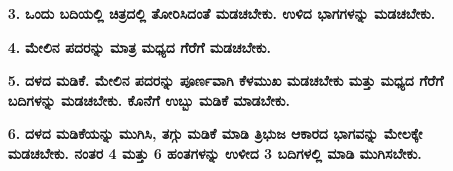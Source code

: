 \begin{enumerate}
\begin{itemize}
\item[{\bf 3.}] \textbf{ಒಂದು ಬದಿಯಲ್ಲಿ ಚಿತ್ರದಲ್ಲಿ ತೋರಿಸಿದಂತೆ ಮಡಚಬೇಕು. ಉಳಿದ ಭಾಗ\-ಗಳನ್ನು ಮಡಚಬೇಕು.}
\begin{figure}[H]
\end{figure}

\item[{\bf 4.}] \textbf{ಮೇಲಿನ ಪದರನ್ನು ಮಾತ್ರ ಮಧ್ಯದ ಗೆರೆಗೆ ಮಡಚಬೇಕು.}

\item[{\bf 5.}] \textbf{ದಳದ ಮಡಿಕೆ. ಮೇಲಿನ ಪದರನ್ನು ಪೂರ್ಣವಾಗಿ ಕೆಳಮುಖ ಮಡಚಬೇಕು ಮತ್ತು ಮಧ್ಯದ ಗೆರೆಗೆ ಬದಿಗಳನ್ನು ಮಡಚಬೇಕು. ಕೊನೆಗೆ ಉಬ್ಬು ಮಡಿಕೆ ಮಾಡಬೇಕು.}
\begin{figure}[H]
\end{figure}

\item[{\bf 6.}] \textbf{ದಳದ ಮಡಿಕೆಯನ್ನು ಮುಗಿಸಿ, ತಗ್ಗು ಮಡಿಕೆ ಮಾಡಿ ತ್ರಿಭುಜ ಆಕಾರದ ಭಾಗವನ್ನು ಮೇಲಕ್ಕೇ ಮಡಚಬೇಕು. ನಂತರ 4 ಮತ್ತು 6 ಹಂತಗಳನ್ನು ಉಳೀದ 3 ಬದಿಗಳಲ್ಲಿ ಮಾಡಿ ಮುಗಿಸಬೇಕು.}


\end{itemize}
\end{enumerate}
